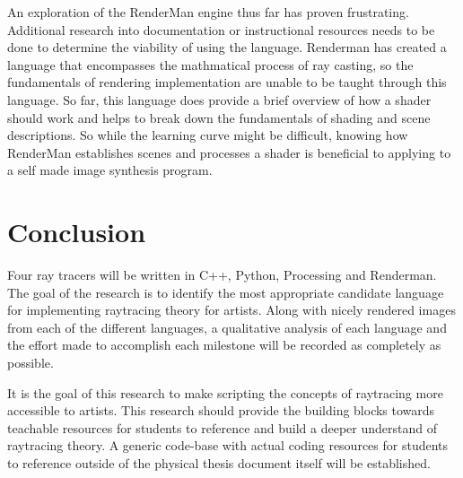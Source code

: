 \documentclass{article}
\begin{document}
An exploration of the RenderMan engine thus far has proven frustrating.  Additional research into documentation or instructional resources needs to be done to determine the viability of using the language.  Renderman has created a language that encompasses the mathmatical process of ray casting, so the fundamentals of rendering implementation are unable to be taught through this language.  So far, this language does provide a brief overview of how a shader should work and helps to break down the fundamentals of shading and scene descriptions.  So while the learning curve might be difficult, knowing how RenderMan establishes scenes and processes a shader is beneficial to applying to a self made image synthesis program.
\section{Conclusion}	
Four ray tracers will be written in C++, Python, Processing and Renderman.  The goal of the research is to identify the most appropriate candidate language for implementing raytracing theory for artists.  Along with nicely rendered images from each of the different languages, a qualitative analysis of each language and the effort made to accomplish each milestone will be recorded as completely as possible.

It is the goal of this research to make scripting the concepts of raytracing more accessible to artists.  This research should provide the building blocks towards teachable resources for students to reference and build a deeper understand of raytracing theory.  A generic code-base with actual coding resources for students to reference outside of the physical thesis document itself will be established.


\end{document}
